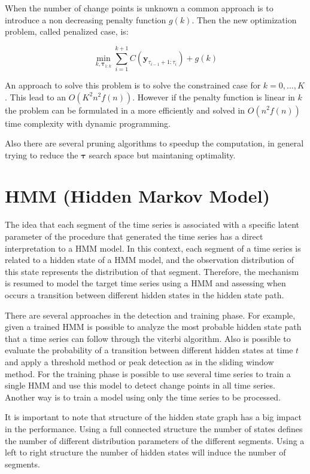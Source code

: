 When the number of change points is unknown a common approach is to introduce a non decreasing penalty function $g(k)$. Then the new optimization problem, called penalized case, is:

\begin{equation}
    \min_{k, \boldsymbol \tau_{1 : k}} \sum \limits_{i = 1}^{k + 1} C(\mathbf{y}_{\tau_{i - 1} + 1 : \tau_{i}}) + g(k)
\end{equation}

An approach to solve this problem is to solve the constrained case for $k = 0, ..., K$. This lead to an $O(K^{2} n^{2} f(n))$. However if the penalty function is linear in $k$ the problem can be formulated in a more efficiently and solved in $O(n^{2} f(n))$ time complexity with dynamic programming.

Also there are several pruning algorithms to speedup the computation, in general trying to reduce the $\boldsymbol \tau$ search space but maintaning optimality.

\section{HMM (Hidden Markov Model)}

The idea that each segment of the time series is associated with a specific latent parameter of the procedure that generated the time series has a direct interpretation to a HMM model. In this context, each segment of a time series is related to a hidden state of a HMM model, and the observation distribution of this state represents the distribution of that segment. Therefore, the mechanism is resumed to model the target time series using a HMM and assessing when occurs a transition between different hidden states in the hidden state path.

There are several approaches in the detection and training phase. For example, given a trained HMM is possible to analyze the most probable hidden state path that a time series can follow through the viterbi algorithm. Also is possible to evaluate the probability of a transition between different hidden states at time $t$ and apply a threshold method or peak detection as in the sliding window method. For the training phase is possible to use several time series to train a single HMM and use this model to detect change points in all time series. Another way is to train a model using only the time series to be processed.

It is important to note that structure of the hidden state graph has a big impact in the performance. Using a full connected structure the number of states defines the number of different distribution parameters of the different segments. Using a left to right structure the number of hidden states will induce the number of segments.

